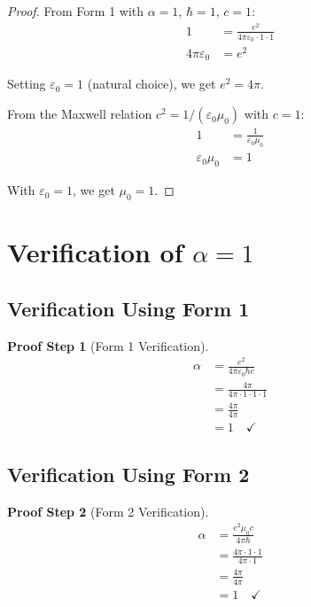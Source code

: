 \documentclass[12pt,a4paper]{article}
\newcommand{\alphaem}{\alpha}
\newtheorem{proof_step}{Proof Step}[section]
\begin{document}
	\begin{proof}
		From Form 1 with $\alphaem = 1$, $\hbar = 1$, $c = 1$:
		\begin{align}
			1 &= \frac{e^2}{4\pi\varepsilon_0 \cdot 1 \cdot 1}\\
			4\pi\varepsilon_0 &= e^2
		\end{align}
		
		Setting $\varepsilon_0 = 1$ (natural choice), we get $e^2 = 4\pi$.
		
		From the Maxwell relation $c^2 = 1/(\varepsilon_0\mu_0)$ with $c = 1$:
		\begin{align}
			1 &= \frac{1}{\varepsilon_0\mu_0}\\
			\varepsilon_0\mu_0 &= 1
		\end{align}
		
		With $\varepsilon_0 = 1$, we get $\mu_0 = 1$.
	\end{proof}
	
	\section{Verification of $\alpha = 1$}
	
	\subsection{Verification Using Form 1}
	
	\begin{proof_step}[Form 1 Verification]
		\begin{align}
			\alphaem &= \frac{e^2}{4\pi\varepsilon_0\hbar c}\\
			&= \frac{4\pi}{4\pi \cdot 1 \cdot 1 \cdot 1}\\
			&= \frac{4\pi}{4\pi}\\
			&= 1 \quad \checkmark
		\end{align}
	\end{proof_step}
	
	\subsection{Verification Using Form 2}
	
	\begin{proof_step}[Form 2 Verification]
		\begin{align}
			\alphaem &= \frac{e^2 \mu_0 c}{4\pi \hbar}\\
			&= \frac{4\pi \cdot 1 \cdot 1}{4\pi \cdot 1}\\
			&= \frac{4\pi}{4\pi}\\
			&= 1 \quad \checkmark
		\end{align}
	\end{proof_step}
	
\end{document}
